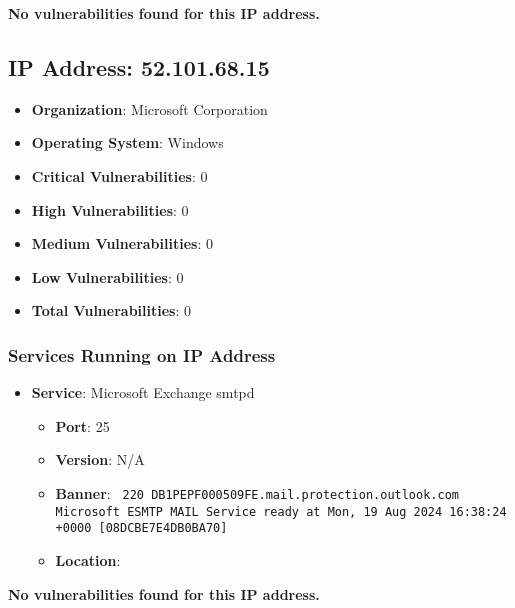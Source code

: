 \documentclass{article}
\begin{document}
\textbf{No vulnerabilities found for this IP address.}




\clearpage



\subsection*{IP Address: 52.101.68.15}

\begin{itemize}
    \item \textbf{Organization}: Microsoft Corporation
    \item \textbf{Operating System}:  Windows 
    \item \textbf{Critical Vulnerabilities}: 0
    \item \textbf{High Vulnerabilities}: 0
    \item \textbf{Medium Vulnerabilities}: 0
    \item \textbf{Low Vulnerabilities}: 0
    \item \textbf{Total Vulnerabilities}: 0
\end{itemize}

\subsubsection*{Services Running on IP Address}

\begin{itemize}
    
        \item \textbf{Service}: Microsoft Exchange smtpd
        \begin{itemize}
            \item \textbf{Port}: 25
            \item \textbf{Version}:  N/A 
            \item \textbf{Banner}: \texttt{
                220 DB1PEPF000509FE.mail.protection.outlook.com Microsoft ESMTP MAIL Service ready at Mon, 19 Aug 2024 16:38:24 +0000 [08DCBE7E4DB0BA70]
            }
            \item \textbf{Location}: \href{  }{  }
        \end{itemize}
    
\end{itemize}


\textbf{No vulnerabilities found for this IP address.}




\clearpage
\end{document}
